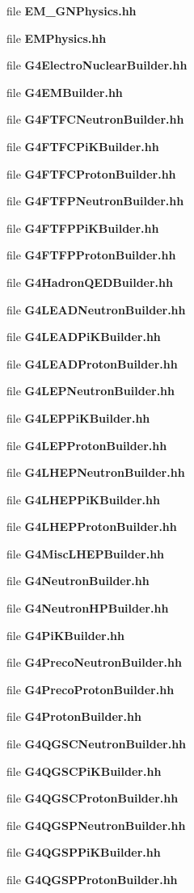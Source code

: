 \begin{CompactItemize}
\item 
file {\bf EM_GNPhysics.hh}
\item 
file {\bf EMPhysics.hh}
\item 
file {\bf G4ElectroNuclearBuilder.hh}
\item 
file {\bf G4EMBuilder.hh}
\item 
file {\bf G4FTFCNeutronBuilder.hh}
\item 
file {\bf G4FTFCPiKBuilder.hh}
\item 
file {\bf G4FTFCProtonBuilder.hh}
\item 
file {\bf G4FTFPNeutronBuilder.hh}
\item 
file {\bf G4FTFPPiKBuilder.hh}
\item 
file {\bf G4FTFPProtonBuilder.hh}
\item 
file {\bf G4HadronQEDBuilder.hh}
\item 
file {\bf G4LEADNeutronBuilder.hh}
\item 
file {\bf G4LEADPiKBuilder.hh}
\item 
file {\bf G4LEADProtonBuilder.hh}
\item 
file {\bf G4LEPNeutronBuilder.hh}
\item 
file {\bf G4LEPPiKBuilder.hh}
\item 
file {\bf G4LEPProtonBuilder.hh}
\item 
file {\bf G4LHEPNeutronBuilder.hh}
\item 
file {\bf G4LHEPPiKBuilder.hh}
\item 
file {\bf G4LHEPProtonBuilder.hh}
\item 
file {\bf G4MiscLHEPBuilder.hh}
\item 
file {\bf G4NeutronBuilder.hh}
\item 
file {\bf G4NeutronHPBuilder.hh}
\item 
file {\bf G4PiKBuilder.hh}
\item 
file {\bf G4PrecoNeutronBuilder.hh}
\item 
file {\bf G4PrecoProtonBuilder.hh}
\item 
file {\bf G4ProtonBuilder.hh}
\item 
file {\bf G4QGSCNeutronBuilder.hh}
\item 
file {\bf G4QGSCPiKBuilder.hh}
\item 
file {\bf G4QGSCProtonBuilder.hh}
\item 
file {\bf G4QGSPNeutronBuilder.hh}
\item 
file {\bf G4QGSPPiKBuilder.hh}
\item 
file {\bf G4QGSPProtonBuilder.hh}

\end{CompactItemize}
